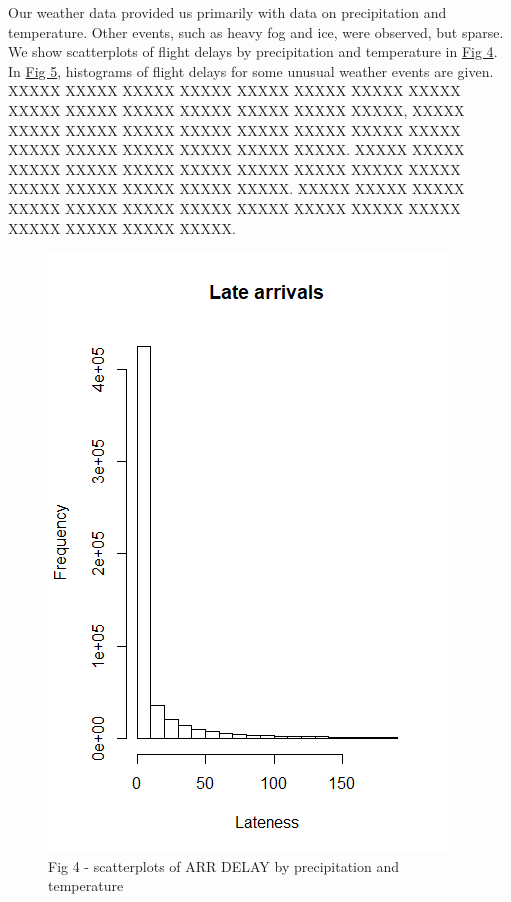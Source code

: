 \documentclass[12pt, a4paper]{book}
\newcommand\tab[1][1cm]{\hspace*{#1}}
\begin{document}
			\tab Our weather data provided us primarily with data on precipitation and temperature. Other events, such as heavy fog and ice, were observed, but sparse. We show scatterplots of flight delays by precipitation and temperature in \underline{Fig 4}. In \underline{Fig 5}, histograms of flight delays for some unusual weather events are given. XXXXX XXXXX XXXXX XXXXX XXXXX XXXXX XXXXX XXXXX XXXXX XXXXX XXXXX XXXXX XXXXX XXXXX XXXXX, XXXXX XXXXX XXXXX XXXXX XXXXX XXXXX XXXXX XXXXX XXXXX XXXXX XXXXX XXXXX XXXXX XXXXX XXXXX. XXXXX XXXXX XXXXX XXXXX XXXXX XXXXX XXXXX XXXXX XXXXX XXXXX XXXXX XXXXX XXXXX XXXXX XXXXX. XXXXX XXXXX XXXXX XXXXX XXXXX XXXXX XXXXX XXXXX XXXXX XXXXX XXXXX XXXXX XXXXX XXXXX XXXXX.
			\begin{figure}[h]
	 		\includegraphics[width = .75 \textwidth]{../figures/LateArrivalsHistogram}
	 		\caption{Fig 4 - scatterplots of ARR DELAY by precipitation and temperature}
	 		\end{figure}
\end{document}
